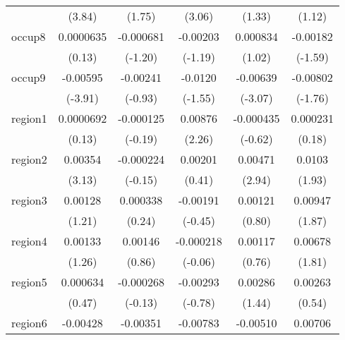 \begin{table}[htbp]
\begin{tabular}{l*{5}{c}}
            &      (3.84)         &      (1.75)         &      (3.06)         &      (1.33)         &      (1.12)         \\
occup8      &   0.0000635         &   -0.000681         &    -0.00203         &    0.000834         &    -0.00182         \\
            &      (0.13)         &     (-1.20)         &     (-1.19)         &      (1.02)         &     (-1.59)         \\
occup9      &    -0.00595\sym{***}&    -0.00241         &     -0.0120         &    -0.00639\sym{**} &    -0.00802         \\
            &     (-3.91)         &     (-0.93)         &     (-1.55)         &     (-3.07)         &     (-1.76)         \\
region1     &   0.0000692         &   -0.000125         &     0.00876\sym{*}  &   -0.000435         &    0.000231         \\
            &      (0.13)         &     (-0.19)         &      (2.26)         &     (-0.62)         &      (0.18)         \\
region2     &     0.00354\sym{**} &   -0.000224         &     0.00201         &     0.00471\sym{**} &      0.0103         \\
            &      (3.13)         &     (-0.15)         &      (0.41)         &      (2.94)         &      (1.93)         \\
region3     &     0.00128         &    0.000338         &    -0.00191         &     0.00121         &     0.00947         \\
            &      (1.21)         &      (0.24)         &     (-0.45)         &      (0.80)         &      (1.87)         \\
region4     &     0.00133         &     0.00146         &   -0.000218         &     0.00117         &     0.00678         \\
            &      (1.26)         &      (0.86)         &     (-0.06)         &      (0.76)         &      (1.81)         \\
region5     &    0.000634         &   -0.000268         &    -0.00293         &     0.00286         &     0.00263         \\
            &      (0.47)         &     (-0.13)         &     (-0.78)         &      (1.44)         &      (0.54)         \\
region6     &    -0.00428\sym{***}&    -0.00351         &    -0.00783         &    -0.00510\sym{***}&     0.00706         \\

\end{tabular}
\end{table}
